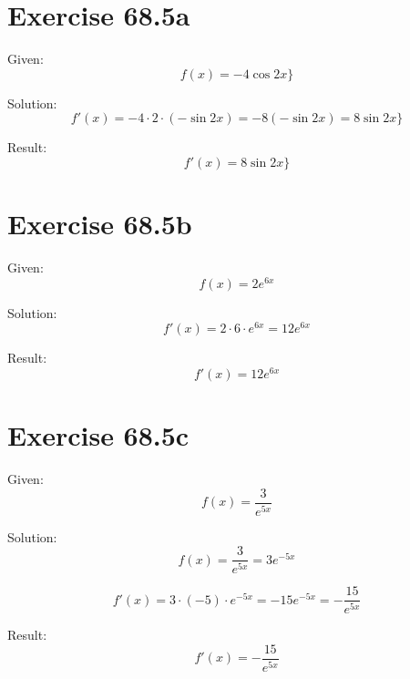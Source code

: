 \documentclass[a4paper, 10pt]{scrartcl}
\begin{document}
\section{Exercise 68.5a}

Given:
\[f(x) = -4\cos{2x}\}\]

Solution:
\[f'(x) = -4\cdot2\cdot(-\sin{2x}) = -8(-\sin{2x}) = 8\sin{2x}\}\]

Result:
\[f'(x) = 8\sin{2x}\}\]

\section{Exercise 68.5b}

Given:
\[f(x) = 2e^{6x}\]

Solution:
\[f'(x) = 2\cdot6\cdot e^{6x} = 12e^{6x}\]

Result:
\[f'(x) = 12e^{6x}\]

\section{Exercise 68.5c}

Given:
\[f(x) = \frac{3}{e^{5x}}\]

Solution:
\[f(x) = \frac{3}{e^{5x}} = 3e^{-5x}\]

\[f'(x) = 3\cdot(-5)\cdot e^{-5x} = -15e^{-5x} = -\frac{15}{e^{5x}}\]

Result:
\[f'(x) = -\frac{15}{e^{5x}}\]
\end{document}
